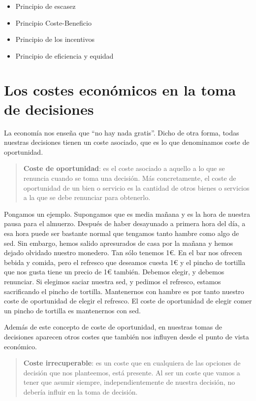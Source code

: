 \documentclass[
]{krantz}
\providecommand{\tightlist}{%
  \setlength{\itemsep}{0pt}\setlength{\parskip}{0pt}}
\begin{document}
\begin{itemize}
\tightlist
\item
  Principio de escasez
\item
  Principio Coste-Beneficio
\item
  Principio de los incentivos
\item
  Principio de eficiencia y equidad
\end{itemize}

\hypertarget{los-costes-econuxf3micos-en-la-toma-de-decisiones}{%
\section{Los costes económicos en la toma de decisiones}\label{los-costes-econuxf3micos-en-la-toma-de-decisiones}}

La economía nos enseña que ``no hay nada gratis''. Dicho de otra forma, todas nuestras decisiones tienen un coste asociado, que es lo que denominamos coste de oportunidad.

\begin{quote}
\textbf{Coste de oportunidad}: es el coste asociado a aquello a lo que se renuncia cuando se toma una decisión. Más concretamente, el coste de oportunidad de un bien o servicio es la cantidad de otros bienes o servicios a la que se debe renunciar para obtenerlo.
\end{quote}

Pongamos un ejemplo. Supongamos que es media mañana y es la hora de nuestra pausa para el almuerzo. Después de haber desayunado a primera hora del día, a esa hora puede ser bastante normal que tengamos tanto hambre como algo de sed. Sin embargo, hemos salido apresurados de casa por la mañana y hemos dejado olvidado nuestro monedero. Tan sólo tenemos 1€.
En el bar nos ofrecen bebida y comida, pero el refresco que deseamos cuesta 1€ y el pincho de tortilla que nos gusta tiene un precio de 1€ también. Debemos elegir, y debemos renunciar. Si elegimos saciar nuestra sed, y pedimos el refresco, estamos sacrificando el pincho de tortilla. Mantenernos con hambre es por tanto nuestro coste de oportunidad de elegir el refresco. El coste de oportunidad de elegir comer un pincho de tortilla es mantenernos con sed.

Además de este concepto de coste de oportunidad, en nuestras tomas de decisiones aparecen otros costes que también nos influyen desde el punto de vista económico.

\begin{quote}
\textbf{Coste irrecuperable}: es un coste que en cualquiera de las opciones de decisión que nos planteemos, está presente. Al ser un coste que vamos a tener que asumir siempre, independientemente de nuestra decisión, no debería influir en la toma de decisión.
\end{quote}
\end{document}
